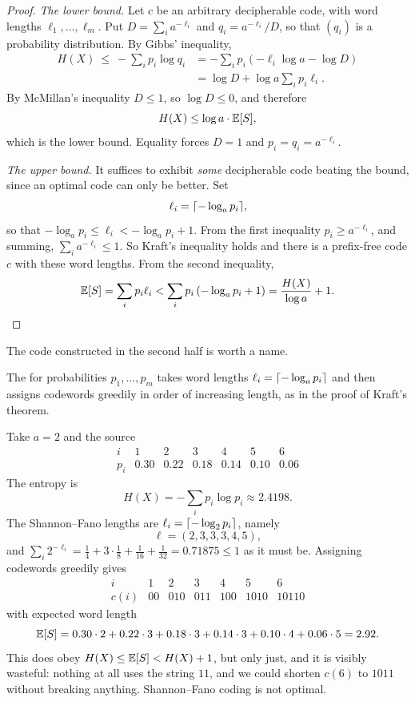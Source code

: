 \documentclass[a4paper]{scrartcl}
\DeclarePairedDelimiter{\ceil}{\lceil}{\rceil}
\begin{document}
\begin{proof}
	\emph{The lower bound.} Let $c$ be an arbitrary decipherable code, with word lengths $\ell_1, \dots, \ell_m$. Put $D = \sum_i a^{-\ell_i}$ and $q_i = a^{-\ell_i}/D$, so that $(q_i)$ is a probability distribution. By Gibbs' inequality,
	\begin{align*}
		H(X) \ \le\  -\sum_i p_i \log q_i &= -\sum_i p_i\left(-\ell_i \log a - \log D\right)\\
		&= \log D + \log a \sum_i p_i \ell_i.
	\end{align*}
	By McMillan's inequality $D \le 1$, so $\log D \le 0$, and therefore
	$$H(X) \le \log a \cdot \mathbb{E}[S],$$
	which is the lower bound. Equality forces $D = 1$ and $p_i = q_i = a^{-\ell_i}$.

	\emph{The upper bound.} It suffices to exhibit \emph{some} decipherable code beating the bound, since an optimal code can only be better. Set
	$$\ell_i = \ceil{-\log_a p_i},$$
	so that $-\log_a p_i \le \ell_i < -\log_a p_i + 1$. From the first inequality $p_i \ge a^{-\ell_i}$, and summing, $\sum_i a^{-\ell_i} \le 1$. So Kraft's inequality holds and there is a prefix-free code $c$ with these word lengths. From the second inequality,
	$$\mathbb{E}[S] = \sum_i p_i \ell_i < \sum_i p_i \left(-\log_a p_i + 1\right) = \frac{H(X)}{\log a} + 1. \qedhere$$
\end{proof}

The code constructed in the second half is worth a name.

\begin{definition}
	The  for probabilities $p_1, \dots, p_m$ takes word lengths $\ell_i = \ceil{-\log_a p_i}$ and then assigns codewords greedily in order of increasing length, as in the proof of Kraft's theorem.
\end{definition}

\begin{example}\label{ex:shannonfano}
	Take $a = 2$ and the source
	$$\begin{array}{c|cccccc}
		i & 1 & 2 & 3 & 4 & 5 & 6 \\ \hline
		p_i & 0.30 & 0.22 & 0.18 & 0.14 & 0.10 & 0.06
	\end{array}$$
	The entropy is
	$$H(X) = -\sum_i p_i \log p_i \approx 2.4198.$$
	The Shannon--Fano lengths are $\ell_i = \ceil{-\log_2 p_i}$, namely
	$$\ell = (2,3,3,3,4,5),$$
	and $\sum_i 2^{-\ell_i} = \tfrac14 + 3\cdot\tfrac18 + \tfrac1{16}+\tfrac1{32} = 0.71875 \le 1$ as it must be. Assigning codewords greedily gives
	$$\begin{array}{c|cccccc}
		i & 1 & 2 & 3 & 4 & 5 & 6 \\ \hline
		c(i) & 00 & 010 & 011 & 100 & 1010 & 10110
	\end{array}$$
	with expected word length
	$$\mathbb{E}[S] = 0.30\cdot 2 + 0.22 \cdot 3 + 0.18 \cdot 3 + 0.14\cdot 3 + 0.10\cdot 4 + 0.06\cdot 5 = 2.92.$$
	This does obey $H(X) \le \mathbb{E}[S] < H(X)+1$, but only just, and it is visibly wasteful: nothing at all uses the string $11$, and we could shorten $c(6)$ to $1011$ without breaking anything. Shannon--Fano coding is not optimal.
\end{example}
\end{document}
